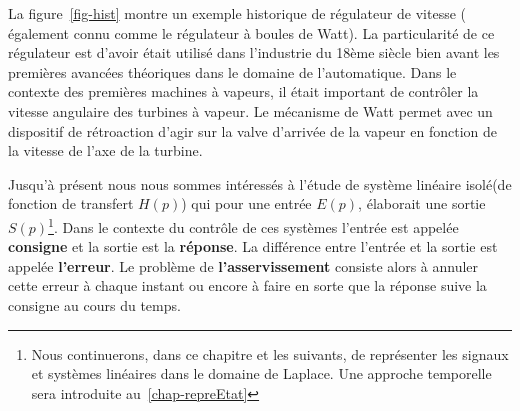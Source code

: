 La figure~\ref{fig-hist} montre un exemple historique de régulateur de 
vitesse ( également connu comme le régulateur à boules de Watt). 
La particularité de ce régulateur est d'avoir était utilisé dans l'industrie
du 18ème siècle bien avant les premières avancées théoriques dans le domaine 
de l'automatique. Dans le contexte des premières machines à vapeurs, 
il était important de contrôler la vitesse angulaire des turbines à vapeur. 
Le mécanisme de Watt permet avec un dispositif de rétroaction d'agir sur la 
valve d'arrivée de la vapeur en fonction de la vitesse de l'axe de la turbine.

Jusqu'à présent nous nous sommes intéressés à l'étude de système 
linéaire \og isolé\fg (de fonction de transfert $H(p)$) 
qui pour une entrée $E(p)$, élaborait une sortie $S(p)$\footnote{Nous
continuerons, dans ce chapitre et les suivants, de représenter 
les signaux et systèmes linéaires dans le domaine de Laplace. Une approche 
temporelle sera introduite au~\cref{chap-repreEtat}}. Dans le contexte du 
contrôle de ces systèmes l'entrée est appelée \textbf{consigne} et la sortie
est la \textbf{réponse}. La différence entre l'entrée et la sortie est 
appelée \textbf{l'erreur}. Le problème de \textbf{l'asservissement} consiste 
alors à annuler cette erreur à chaque instant ou encore à faire en sorte que 
la réponse suive la consigne au cours du temps.

